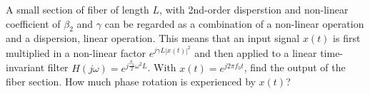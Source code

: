 \documentclass[10pt,letterpaper]{article}
\newcommand{\Q}[1]{\textbf{Question #1)}}
\begin{document}
A small section of fiber of length $L$, with 2nd-order disperstion and non-linear coefficient of $\beta_2$ and $\gamma$ can be regarded as a combination of a non-linear operation and a dispersion, linear operation. This means that an input signal $x(t)$ is first multiplied in a non-linear factor $e^{j\gamma L |x(t)|^2}$ and then applied to a linear time-invariant filter $H(j\omega)=e^{j\frac{\beta_2}{2}\omega^2L}$. With $x(t)=e^{j2\pi f_0 t}$, find the output of the fiber section. How much phase rotation is experienced by $x(t)$?
%
%
%
%
%
\end{document}
